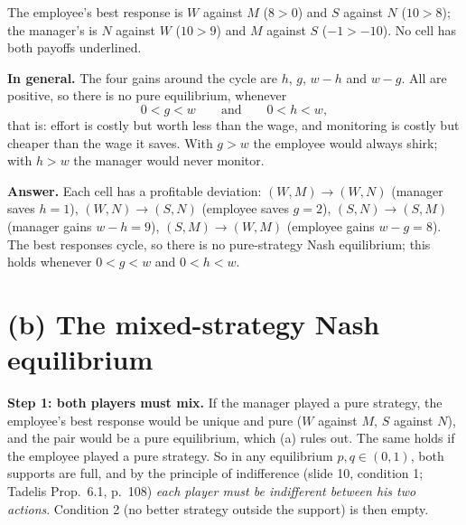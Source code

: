 \documentclass[11pt,a4paper]{article}
\newcommand{\answer}[1]{\begin{tcolorbox}[colback=ans!5,colframe=ans,boxrule=0.6pt,
  left=5pt,right=5pt,top=3pt,bottom=3pt]\textbf{Answer.} #1\end{tcolorbox}}
\begin{document}
\begin{center}
\end{center}

The employee's best response is $W$ against $M$ ($8 > 0$) and $S$ against $N$ ($10 > 8$); the
manager's is $N$ against $W$ ($10 > 9$) and $M$ against $S$ ($-1 > -10$). No cell has both payoffs
underlined.

\textbf{In general.} The four gains around the cycle are $h$, $g$, $w - h$ and $w - g$. All are
positive, so there is no pure equilibrium, whenever
\[
  0 < g < w \qquad\text{and}\qquad 0 < h < w,
\]
that is: effort is costly but worth less than the wage, and monitoring is costly but cheaper than
the wage it saves. With $g > w$ the employee would always shirk; with $h > w$ the manager would never
monitor.

\answer{Each cell has a profitable deviation: $(W,M) \to (W,N)$ (manager saves $h = 1$),
$(W,N) \to (S,N)$ (employee saves $g = 2$), $(S,N) \to (S,M)$ (manager gains $w - h = 9$),
$(S,M) \to (W,M)$ (employee gains $w - g = 8$). The best responses cycle, so there is no pure-strategy
Nash equilibrium; this holds whenever $0 < g < w$ and $0 < h < w$.}

\section*{(b) The mixed-strategy Nash equilibrium}

\textbf{Step 1: both players must mix.} If the manager played a pure strategy, the employee's best
response would be unique and pure ($W$ against $M$, $S$ against $N$), and the pair would be a pure
equilibrium, which (a) rules out. The same holds if the employee played a pure strategy. So in any
equilibrium $p, q \in (0, 1)$, both supports are full, and by the principle of indifference (slide 10,
condition 1; Tadelis Prop.~6.1, p.~108) \emph{each player must be indifferent between his two
actions}. Condition 2 (no better strategy outside the support) is then empty.
\end{document}
